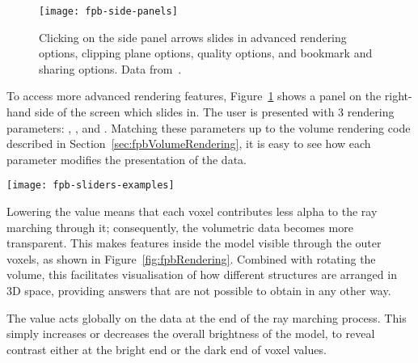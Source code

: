 \begin{figure}[htbp!]
\centering
\texttt{[image: fpb-side-panels]}
\caption[FPBioimage: Side panels provide more advanced rendering options]{Clicking on the side panel arrows slides in advanced rendering options, clipping plane options, quality options, and bookmark and sharing options. Data from~\cite{kumar2014dual}. } %
\label{fig:FPBpanels}
\end{figure}

To access more advanced rendering features, Figure~\ref{fig:FPBpanels} shows a panel on the right-hand side of the screen which slides in.
The user is presented with 3 rendering parameters: , , and .
Matching these parameters up to the volume rendering code described in Section~\ref{sec:fpbVolumeRendering}, it is easy to see how each parameter modifies the presentation of the data.

\begin{sidewaysfigure}[p]
\centering
\texttt{[image: fpb-sliders-examples]}
\caption[FPBioimage: Advanced rendering features provide unique views of volumetric data]{(a–c): Four-colour OPT data of a mouse embryo. (d–f): MRI data of a human head. (g–i): two-colour light-sheet microscopy data of a drosophila embryo. FPBioimage's built-in transparency feature has been used to render (c) and (f), revealing data within the volume; the cutting tool has been used for (c), (f), (h) and (i), removing outer voxels from the data; and h shows a bookmark in creation, which can be shared with other users. Reproduced from \cite{fantham2017new}. Raw data provided by: (a–c), J. McGinty~\cite{sharpe2002optical}; (d–f), Stanford Volume Data Archive~\cite{levoy1988volume}; (g–i), P. Keller~\cite{chhetri2015whole}. }
\label{fig:fpbRendering}
\end{sidewaysfigure}

Lowering the  value means that each voxel contributes less alpha to the ray marching through it; consequently, the volumetric data becomes more transparent.
This makes features inside the model visible through the outer voxels, as shown in Figure~\ref{fig:fpbRendering}.
Combined with rotating the volume, this facilitates visualisation of how different structures are arranged in 3D space, providing answers that are not possible to obtain in any other way.

The  value acts globally on the data at the end of the ray marching process.
This simply increases or decreases the overall brightness of the model, to reveal contrast either at the bright end or the dark end of voxel values. %

